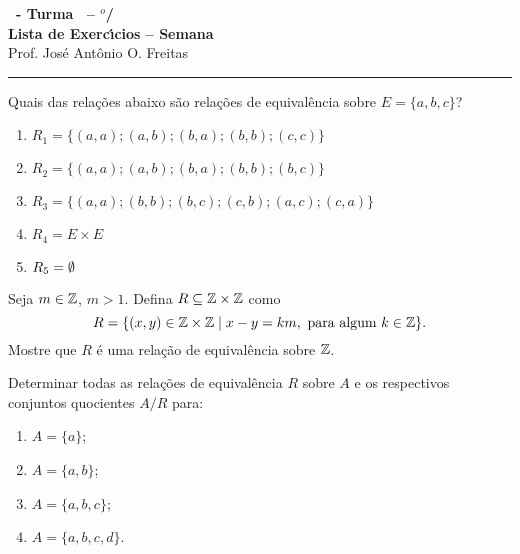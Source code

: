 \documentclass[12pt]{exam}
\begin{document}
    \begin{center}
    {\Large\bf \disciplina\ - Turma \turma\ -- \semestre$^{o}$/\ano} \\ \vspace{9pt} {\large\bf
        Lista de Exerc{\'\i}cios -- Semana \numerosemana}\\ \vspace{9pt} Prof. Jos{\'e} Ant{\^o}nio O. Freitas
    \end{center}
    \hrule

    \vspace{.6cm}

    \questao{} Quais das rela{\c c}{\~o}es abaixo s{\~a}o rela{\c c}{\~o}es de equival{\^e}ncia sobre $E = \{a,b,c\}$?
\begin{enumerate}[label={\alph*})]
    \item $R_1 = \{(a,a);(a,b);(b,a);(b,b);(c,c)\}$
    \item $R_2 = \{(a,a);(a,b);(b,a);(b,b);(b,c)\}$
    \item $R_3 = \{(a,a);(b,b);(b,c);(c,b);(a,c);(c,a)\}$
    \item $R_4 = E \times E$
    \item $R_5 = \emptyset$
\end{enumerate}

\vspace{.3cm}

\questao{} Seja $m \in \mathbb{Z}$, $m > 1$. Defina $R \subseteq \mathbb{Z}\times\mathbb{Z}$ como
\[
  R = \{(x,y) \in \mathbb{Z}\times\mathbb{Z} \mid x - y = km, \mbox{ para algum } k \in \mathbb{Z}\}.
\]
Mostre que $R$ \'e uma rela\c{c}\~ao de equival\^encia sobre $\mathbb{Z}$.

\vspace{.3cm}

\questao{} Determinar todas as rela{\c c}{\~o}es de equival{\^e}ncia
$R$ sobre $A$ e os respectivos conjuntos quocientes $A/R$ para:
\begin{enumerate}[label={\alph*})]
    \item $A=\{a\}$;
    \item $A=\{a,b\}$;
    \item $A=\{a,b,c\}$;
    \item $A=\{a,b,c,d\}$.
\end{enumerate}

\vspace{.3cm}
\end{document}
